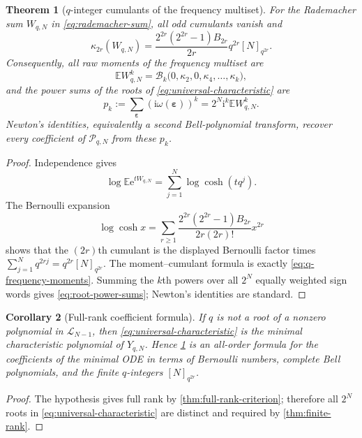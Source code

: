 \documentclass[11pt]{article}
\numberwithin{equation}{section}
\newtheorem{theorem}{Theorem}[section]
\newtheorem{corollary}[theorem]{Corollary}
\theoremstyle{definition}
\theoremstyle{remark}
\newcommand{\E}{\mathbb E}
\newcommand{\ii}{\mathrm i}
\newcommand{\e}{\mathrm e}
\newcommand{\eps}{\varepsilon}
\newcommand{\Bell}{\mathcal B}
\begin{document}
\begin{theorem}[$q$-integer cumulants of the frequency multiset]
\label{thm:q-cumulants}
For the Rademacher sum $W_{q,N}$ in \eqref{eq:rademacher-sum}, all odd
cumulants vanish and
\begin{equation}
 \boxed{
 \kappa_{2r}(W_{q,N})=
 \frac{2^{2r}(2^{2r}-1)B_{2r}}{2r}
 q^{2r}[N]_{q^{2r}}.}
 \label{eq:q-cumulants}
\end{equation}
Consequently, all raw moments of the frequency multiset are
\begin{equation}
 \E W_{q,N}^k=
 \Bell_k\bigl(0,\kappa_2,0,\kappa_4,\ldots,\kappa_k\bigr),
 \label{eq:q-frequency-moments}
\end{equation}
and the power sums of the roots of \eqref{eq:universal-characteristic} are
\begin{equation}
 p_k:=\sum_{\bm\eps}
 \left(\ii\omega(\bm\eps)\right)^k
 =2^N\ii^k\E W_{q,N}^k.
 \label{eq:root-power-sums}
\end{equation}
Newton's identities, equivalently a second Bell-polynomial transform, recover
every coefficient of $\mathscr P_{q,N}$ from these $p_k$.
\end{theorem}
\begin{proof}
Independence gives
\begin{equation}
 \log\E\e^{tW_{q,N}}=
 \sum_{j=1}^{N}\log\cosh(tq^j).
 \label{eq:logcosh-sum}
\end{equation}
The Bernoulli expansion
\begin{equation}
 \log\cosh x=
 \sum_{r\ge1}
 \frac{2^{2r}(2^{2r}-1)B_{2r}}{2r(2r)!}x^{2r}
 \label{eq:logcosh-Bernoulli}
\end{equation}
shows that the $(2r)$th cumulant is the displayed Bernoulli factor times
$\sum_{j=1}^{N}q^{2rj}=q^{2r}[N]_{q^{2r}}$.  The moment--cumulant formula is
exactly \eqref{eq:q-frequency-moments}.  Summing the $k$th powers over all
$2^N$ equally weighted sign words gives \eqref{eq:root-power-sums}; Newton's
identities are standard.
\end{proof}

\begin{corollary}[Full-rank coefficient formula]
\label{cor:full-rank-q-coeff}
If $q$ is not a root of a nonzero polynomial in $\mathscr L_{N-1}$, then
\eqref{eq:universal-characteristic} is the minimal characteristic polynomial
of $Y_{q,N}$.  Hence \cref{thm:q-cumulants} is an all-order formula for the
coefficients of the minimal ODE in terms of Bernoulli numbers, complete Bell
polynomials, and the finite $q$-integers $[N]_{q^{2r}}$.
\end{corollary}
\begin{proof}
The hypothesis gives full rank by \cref{thm:full-rank-criterion}; therefore all
$2^N$ roots in \eqref{eq:universal-characteristic} are distinct and required
by \cref{thm:finite-rank}.
\end{proof}
\end{document}

